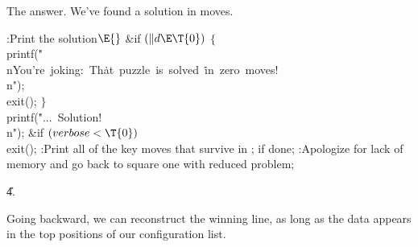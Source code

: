 The answer. We've found a solution in  moves.

\Y\B\4:Print the solution\X${}\E{}$\6
\&{if} ${}(\|d\E\T{0}){}$\5
${}\{{}$\1\6
\\{printf}(\.{"\\nYou're\ joking:\ Th}\)\.{at\ puzzle\ is\ solved\ }\)\.{in\
zero\ moves!\\n"});\6
\\{exit}();\6
\4${}\}{}$\2\6
\\{printf}(\.{"...\ Solution!\\n"});\6
\&{if} ${}(\\{verbose}<){}$\1\5
\\{exit}(\T{0});\2\6
:Print all of the key moves that survive in ;  if
done\X;\6
:Apologize for lack of memory and go back to square one with reduced
problem\X;\par
\U4.\fi

Going backward, we can reconstruct the winning line, as
long as the data
appears in the top  positions of our configuration list.

